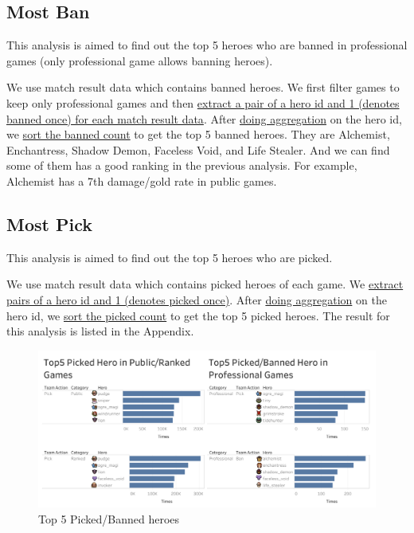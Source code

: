 \documentclass{article}
\begin{document}
\subsection{Most Ban}

This analysis is aimed to find out the top 5 heroes who are banned in professional games (only professional game allows banning heroes).

We use match result data which contains banned heroes. We first filter games to keep only professional games and then \href{https://github.com/Vopaaz/big-data-psg-lgd/blob/master/src/main/scala/MostBan.scala#L29-L30}{extract a pair of a hero id and 1 (denotes banned once) for each match result data}. After \href{https://github.com/Vopaaz/big-data-psg-lgd/blob/master/src/main/scala/MostBan.scala#L31}{doing aggregation} on the hero id, we \href{https://github.com/Vopaaz/big-data-psg-lgd/blob/master/src/main/scala/MostBan.scala#L33}{sort the banned count} to get the top 5 banned heroes. They are Alchemist, Enchantress, Shadow Demon, Faceless Void, and Life Stealer. And we can find some of them has a good ranking in the previous analysis. For example, Alchemist has a 7th damage/gold rate in public games.

\subsection{Most Pick}

This analysis is aimed to find out the top 5 heroes who are picked.

We use match result data which contains picked heroes of each game. We \href{https://github.com/Vopaaz/big-data-psg-lgd/blob/master/src/main/scala/MostPick.scala#L34}{extract pairs of a hero id and 1 (denotes picked once)}. After \href{https://github.com/Vopaaz/big-data-psg-lgd/blob/master/src/main/scala/MostPick.scala#L35}{doing aggregation} on the hero id, we \href{https://github.com/Vopaaz/big-data-psg-lgd/blob/master/src/main/scala/MostPick.scala#L37}{sort the picked count} to get the top 5 picked heroes. The result for this analysis is listed in the Appendix.

\begin{figure}[H]
\centering
\includegraphics[width=\textwidth]{pic/MostPickedBanned.png}
\caption{Top 5 Picked/Banned heroes}
\label{Top 5 Picked/Banned heroes}
\end{figure}
\end{document}
